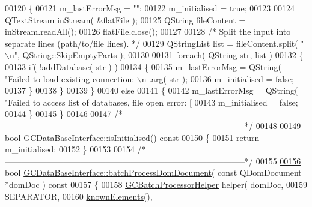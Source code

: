 \begin{DoxyCode}
00120   \{
00121     m\_lastErrorMsg = \textcolor{stringliteral}{""};
00122     m\_initialised = \textcolor{keyword}{true};
00123 
00124     QTextStream inStream( &flatFile );
00125     QString fileContent = inStream.readAll();
00126     flatFile.close();
00127 
00128     \textcolor{comment}{/* Split the input into separate lines (path/to/file lines). */}
00129     QStringList list = fileContent.split( \textcolor{stringliteral}{"\(\backslash\)n"}, QString::SkipEmptyParts );
00130 
00131     \textcolor{keywordflow}{foreach}( QString str, list )
00132     \{
00133       \textcolor{keywordflow}{if}( !\hyperlink{class_g_c_data_base_interface_a6b3cc67ba9e4bdf58b49869243446764}{addDatabase}( str ) )
00134       \{
00135         m\_lastErrorMsg = QString( \textcolor{stringliteral}{"Failed to load existing connection: \(\backslash\)n %
      .arg( str );
00136         m\_initialised = \textcolor{keyword}{false};
00137       \}
00138     \}
00139   \}
00140   \textcolor{keywordflow}{else}
00141   \{
00142     m\_lastErrorMsg = QString( \textcolor{stringliteral}{"Failed to access list of databases, file open
       error: [%
00143     m\_initialised = \textcolor{keyword}{false};
00144   \}
00145 \}
00146 
00147 \textcolor{comment}{/*
      --------------------------------------------------------------------------------------*/}
00148 
\hypertarget{gcdatabaseinterface_8cpp_source_l00149}{}\hyperlink{class_g_c_data_base_interface_a2d20cd6ae4f1ba007fdc1367611b97e0}{00149} \textcolor{keywordtype}{bool} \hyperlink{class_g_c_data_base_interface_a2d20cd6ae4f1ba007fdc1367611b97e0}{GCDataBaseInterface::isInitialised}()\textcolor{keyword}{ const}
00150 \textcolor{keyword}{}\{
00151   \textcolor{keywordflow}{return} m\_initialised;
00152 \}
00153 
00154 \textcolor{comment}{/*
      --------------------------------------------------------------------------------------*/}
00155 
\hypertarget{gcdatabaseinterface_8cpp_source_l00156}{}\hyperlink{class_g_c_data_base_interface_a2c20ff88464664aef988c9c0417e19be}{00156} \textcolor{keywordtype}{bool} \hyperlink{class_g_c_data_base_interface_a2c20ff88464664aef988c9c0417e19be}{GCDataBaseInterface::batchProcessDomDocument}( \textcolor{keyword}{const} QDomDocument *domDoc )\textcolor{keyword}{
       const}
00157 \textcolor{keyword}{}\{
00158   \hyperlink{class_g_c_batch_processor_helper}{GCBatchProcessorHelper} helper( domDoc,
00159                                  SEPARATOR,
00160                                  \hyperlink{class_g_c_data_base_interface_a6c4eabd4f39a1c23ab320bb0dbc855d4}{knownElements}(),
}}
\end{DoxyCode}
